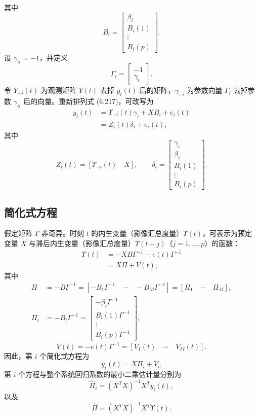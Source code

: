 其中
\[
B_i=\begin{bmatrix}\beta_i\\B_i(1)\\\vdots\\B_i(p)\end{bmatrix}.
\]
设 $\gamma_{ii}=-1$，并定义
\[
\Gamma_i=\begin{bmatrix}-1\\\gamma_i\end{bmatrix}.
\]
令 $Y_{-i}(t)$ 为观测矩阵 $Y(t)$ 去掉 $y_i(t)$ 后的矩阵，$\gamma_{-i}$ 为参数向量 $\Gamma_i$ 去掉参数 $\gamma_{ii}$ 后的向量。重新排列式 (6.217)，可改写为
\begin{equation}
\begin{aligned}
y_i(t)&=\Upsilon_{-i}(t)\gamma_i+XB_i+e_i(t)\\
&=Z_i(t)\delta_i+e_i(t),
\end{aligned}\tag{6.218}
\end{equation}
其中
\[
Z_i(t)=[\Upsilon_{-i}(t)\quad X],\qquad
\delta_i=\begin{bmatrix}\gamma_i\\\beta_i\\B_i(1)\\\vdots\\B_i(p)\end{bmatrix}.
\]

\subsection{简化式方程}

假定矩阵 $\Gamma$ 非奇异。时刻 $t$ 的内生变量（影像汇总度量）$\Upsilon(t)$，可表示为预定变量 $X$ 与滞后内生变量（影像汇总度量）$\Upsilon(t-j)$（$j=1,\ldots,p$）的函数：
\begin{equation}
\begin{aligned}
\Upsilon(t)&=-XB\Gamma^{-1}-e(t)\Gamma^{-1}\\
&=X\Pi+V(t),
\end{aligned}\tag{6.219}
\end{equation}
其中
\begin{equation}
\begin{aligned}
\Pi&=-B\Gamma^{-1}=[-B_1\Gamma^{-1}\quad\cdots\quad-B_M\Gamma^{-1}]=[\Pi_1\quad\cdots\quad\Pi_M],\\
\Pi_i&=-B_i\Gamma^{-1}=\begin{bmatrix}-\beta_i\Gamma^{-1}\\B_i(1)\Gamma^{-1}\\\vdots\\B_i(p)\Gamma^{-1}\end{bmatrix},
\end{aligned}\tag{6.220}
\end{equation}
\[
V(t)=-e(t)\Gamma^{-1}=[V_1(t)\quad\cdots\quad V_M(t)].
\]
因此，第 $i$ 个简化式方程为
\begin{equation}
y_i(t)=X\Pi_i+V_i.
\tag{6.221}
\end{equation}
第 $i$ 个方程与整个系统回归系数的最小二乘估计量分别为
\[
\widehat\Pi_i=(X^TX)^{-1}X^Ty_i(t),
\]
以及
\begin{equation}
\widehat\Pi=(X^TX)^{-1}X^T\Upsilon(t).
\tag{6.222}
\end{equation}

